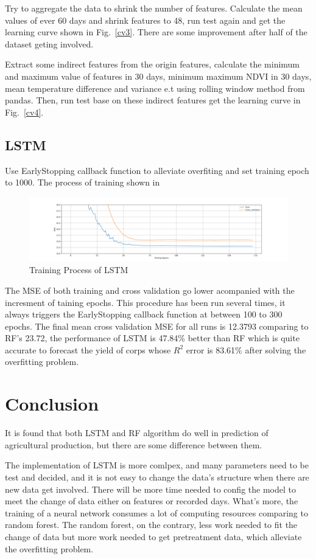\documentclass[conference]{IEEEtran}
\begin{document}
Try to aggregate the data to shrink the number of features. Calculate the mean values of ever 60 days and shrink features to 48, run test again and get the learning curve shown in Fig.~\ref{cv3}. There are some improvement after half of the dataset geting involved.

Extract some indirect features from the origin features, calculate the minimum and maximum value of features in 30 days, minimum maximum NDVI in 30 days, mean temperature difference and variance e.t using rolling window method from pandas. Then, run test base on these indirect features get the learning curve in Fig.~\ref{cv4}.

\subsection{LSTM}
Use EarlyStopping callback function to alleviate overfiting and set training epoch to 1000. The process of training shown in %

\begin{figure}[htbp]
  \centerline{\includegraphics[width=\linewidth]{figures/lp.png}}
  \caption{Training Process of LSTM}
  \label{fig:train}
\end{figure}

The MSE of both training and cross validation go lower acompanied with the incresment of taining epochs. This procedure has been run several times, it always triggers the EarlyStopping callback function at between 100 to 300 epochs. The final mean cross validation MSE for all runs is 12.3793 comparing to RF's 23.72, the performance of LSTM is 47.84\% better than RF which is quite accurate to forecast the yield of corps whose $R^2$ error is 83.61\% after solving the overfitting problem.

\section{Conclusion}
It is found that both LSTM and RF algorithm do well in prediction of agricultural production, but there are some difference between them.

The implementation of LSTM is more comlpex, and many parameters need to be test and decided, and it is not easy to change the data's structure when there are new data get involved. There will be more time needed to config the model to meet the change of data either on features or recorded days. What's more, the training of a neural network consumes a lot of computing resources comparing to random forest. The random forest, on the contrary, less work needed to fit the change of data but more work needed to get pretreatment data, which alleviate the overfitting problem.
\end{document}
